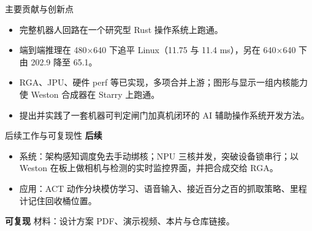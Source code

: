 \documentclass[aspectratio=169,fontset=mac]{ctexbeamer}
\begin{document}
\begin{frame}{主要贡献与创新点}
\begin{itemize}
\item 完整机器人回路在一个研究型 Rust 操作系统上跑通。
\item 端到端推理在 480×640 下追平 Linux（11.75 与 11.4 ms），另在 640×640 下由 202.9 降至 65.1。
\item RGA、JPU、硬件 perf 等已实现，多项合并上游；图形与显示一组内核能力使 Weston 合成器在 Starry 上跑通。
\item 提出并实践了一套机器可判定闸门加真机闭环的 AI 辅助操作系统开发方法。
\end{itemize}
\end{frame}

\begin{frame}{后续工作与可复现性}
\textbf{\color{ink}后续}
\begin{itemize}\small
\item 系统：架构感知调度免去手动绑核；NPU 三核并发，突破设备锁串行；以 Weston 在板上做相机与检测的实时监控界面，并把合成交给 RGA。
\item 应用：ACT 动作分块模仿学习、语音输入、接近百分之百的抓取策略、里程计记住回收桶位置。
\end{itemize}
\vskip2pt
\textbf{\color{ink}可复现}
\vskip4pt
\footnotesize 材料：设计方案 PDF、演示视频、本片与仓库链接。
\end{frame}
\end{document}

